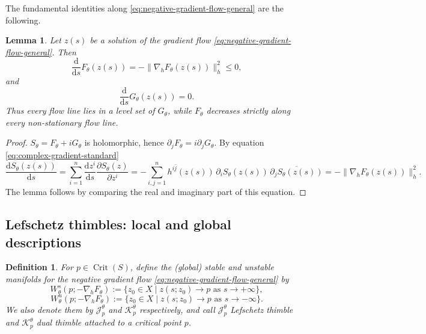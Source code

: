 \documentclass[11pt]{amsart}
\theoremstyle{plain}
\newtheorem{lem}[thm]{Lemma}
\newtheorem{defn}[thm]{Definition}
\newcommand{\dd}{\mathrm d}
\newcommand{\Crit}{\operatorname{Crit}}
\newcommand{\J}{\mathcal J}
\newcommand{\Kk}{\mathcal K}
\begin{document}
The fundamental identities along \eqref{eq:negative-gradient-flow-general} are the following.

\begin{lem}\label{lem:F-decreases-G-conserved}
Let \(z(s)\) be a solution of the gradient flow \eqref{eq:negative-gradient-flow-general}. Then
\begin{equation}\label{eq:F-decreases}
\frac{\dd}{\dd s}F_\theta(z(s))=-\lVert \nabla_h F_\theta(z(s))\rVert_h^2\le 0,
\end{equation}
and
\begin{equation}\label{eq:G-conserved}
\frac{\dd}{\dd s}G_\theta(z(s))=0.
\end{equation}
Thus every flow line lies in a level set of \(G_\theta\), while \(F_\theta\) decreases strictly along every non-stationary flow line.
\end{lem}

\begin{proof} $S_\theta=F_\theta+iG_\theta$ is holomorphic, hence $\partial_j F_\theta=i \partial_j G_\theta$. By equation \eqref{eq:complex-gradient-standard} 
$$
\frac{\dd S_\theta(z(s))}{\dd s}=\sum_{i=1}^n\frac{\dd z^i}{\dd s}\frac{\partial S_\theta(z)}{\partial z^i}=-\sum_{i,j=1}^n h^{i\bar j}(z(s))\,\partial_i S_\theta(z(s))\,\overline{\partial_j S_\theta(z(s))}=-\lVert \nabla_h F_\theta(z(s))\rVert_h^2.
$$
The lemma follows by comparing the real and imaginary part of this equation. 
\end{proof}

\smallskip
\subsection{Lefschetz thimbles: local and global descriptions}

\begin{defn}\label{def:stable-unstable}
For \(p\in\Crit(S)\), define the (global) stable and unstable manifolds for the negative gradient flow \eqref{eq:negative-gradient-flow-general} by
\begin{equation*}
W^s_\theta(p;-\nabla_h F_{\theta}):=\{z_0\in X\mid z(s;z_0)\to p\text{ as }s\to +\infty\},
\end{equation*}
\begin{equation*}
W^u_\theta(p;-\nabla_h F_{\theta}):=\{z_0\in X\mid z(s;z_0)\to p\text{ as }s\to -\infty\}.
\end{equation*}
We also denote them by $\J_p^{\theta}$ and $\Kk_p^{\theta}$ respectively, and call $\J_p^{\theta}$ Lefschetz thimble and $\Kk_p^{\theta}$ dual thimble attached to a critical point $p$.
\end{defn}
\end{document}
